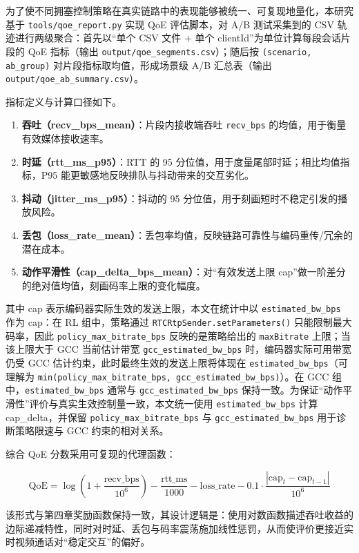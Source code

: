 为了使不同拥塞控制策略在真实链路中的表现能够被统一、可复现地量化，本研究基于 \texttt{tools/qoe\_report.py} 实现 QoE 评估脚本，对 A/B 测试采集到的 CSV 轨迹进行两级聚合：首先以“单个 CSV 文件 + 单个 clientId”为单位计算每段会话片段的 QoE 指标（输出 \texttt{output/qoe\_segments.csv}）；随后按 \texttt{(scenario, ab\_group)} 对片段指标取均值，形成场景级 A/B 汇总表（输出 \texttt{output/qoe\_ab\_summary.csv}）。

指标定义与计算口径如下。

\begin{enumerate}
    \item \textbf{吞吐（recv\_bps\_mean）}：片段内接收端吞吐 \texttt{recv\_bps} 的均值，用于衡量有效媒体接收速率。
    \item \textbf{时延（rtt\_ms\_p95）}：RTT 的 95 分位值，用于度量尾部时延；相比均值指标，P95 能更敏感地反映排队与抖动带来的交互劣化。
    \item \textbf{抖动（jitter\_ms\_p95）}：抖动的 95 分位值，用于刻画短时不稳定引发的播放风险。
    \item \textbf{丢包（loss\_rate\_mean）}：丢包率均值，反映链路可靠性与编码重传/冗余的潜在成本。
    \item \textbf{动作平滑性（cap\_delta\_bps\_mean）}：对“有效发送上限 cap”做一阶差分的绝对值均值，刻画码率上限的变化幅度。
\end{enumerate}

其中 cap 表示编码器实际生效的发送上限，本文在统计中以 \texttt{estimated\_bw\_bps} 作为 cap：在 RL 组中，策略通过 \texttt{RTCRtpSender.setParameters()} 只能限制最大码率，因此 \texttt{policy\_max\_bitrate\_bps} 反映的是策略给出的 \texttt{maxBitrate} 上限；当该上限大于 GCC 当前估计带宽 \texttt{gcc\_estimated\_bw\_bps} 时，编码器实际可用带宽仍受 GCC 估计约束，此时最终生效的发送上限将体现在 \texttt{estimated\_bw\_bps}（可理解为 \texttt{min(policy\_max\_bitrate\_bps, gcc\_estimated\_bw\_bps)}）。在 GCC 组中，\texttt{estimated\_bw\_bps} 通常与 \texttt{gcc\_estimated\_bw\_bps} 保持一致。为保证“动作平滑性”评价与真实生效控制量一致，本文统一使用 \texttt{estimated\_bw\_bps} 计算 cap\_delta，并保留 \texttt{policy\_max\_bitrate\_bps} 与 \texttt{gcc\_estimated\_bw\_bps} 用于诊断策略限速与 GCC 约束的相对关系。

综合 QoE 分数采用可复现的代理函数：

$$
\mathrm{QoE} = \log\left(1 + \frac{\mathrm{recv\_bps}}{10^6}\right) - \frac{\mathrm{rtt\_ms}}{1000} - \mathrm{loss\_rate} - 0.1 \cdot \frac{|\mathrm{cap}_t - \mathrm{cap}_{t-1}|}{10^6}
$$

该形式与第四章奖励函数保持一致，其设计逻辑是：使用对数函数描述吞吐收益的边际递减特性，同时对时延、丢包与码率震荡施加线性惩罚，从而使评价更接近实时视频通话对“稳定交互”的偏好。

